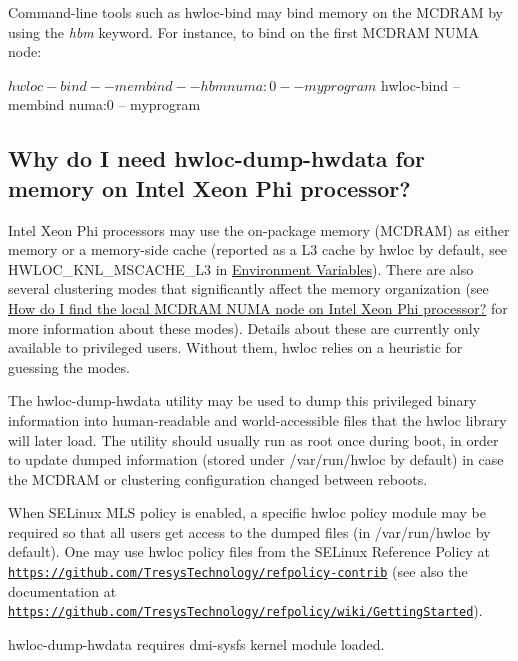 Command-\/line tools such as {\ttfamily hwloc-\/bind} may bind memory on the M\+C\+D\+R\+AM by using the {\itshape hbm} keyword. For instance, to bind on the first M\+C\+D\+R\+AM N\+U\+MA node\+:

\begin{DoxyVerb}$ hwloc-bind --membind --hbm numa:0 -- myprogram
$ hwloc-bind --membind numa:0 -- myprogram
\end{DoxyVerb}
\hypertarget{a00394_faq_knl_dump}{}\subsection{Why do I need hwloc-\/dump-\/hwdata for memory on Intel Xeon Phi processor?}\label{a00394_faq_knl_dump}
Intel Xeon Phi processors may use the on-\/package memory (M\+C\+D\+R\+AM) as either memory or a memory-\/side cache (reported as a L3 cache by hwloc by default, see {\ttfamily H\+W\+L\+O\+C\+\_\+\+K\+N\+L\+\_\+\+M\+S\+C\+A\+C\+H\+E\+\_\+\+L3} in \hyperlink{a00382}{Environment Variables}). There are also several clustering modes that significantly affect the memory organization (see \hyperlink{a00394_faq_knl_numa}{How do I find the local M\+C\+D\+R\+AM N\+U\+MA node on Intel Xeon Phi processor?} for more information about these modes). Details about these are currently only available to privileged users. Without them, hwloc relies on a heuristic for guessing the modes.

The hwloc-\/dump-\/hwdata utility may be used to dump this privileged binary information into human-\/readable and world-\/accessible files that the hwloc library will later load. The utility should usually run as root once during boot, in order to update dumped information (stored under /var/run/hwloc by default) in case the M\+C\+D\+R\+AM or clustering configuration changed between reboots.

When S\+E\+Linux M\+LS policy is enabled, a specific hwloc policy module may be required so that all users get access to the dumped files (in /var/run/hwloc by default). One may use hwloc policy files from the S\+E\+Linux Reference Policy at \href{https://github.com/TresysTechnology/refpolicy-contrib}{\tt https\+://github.\+com/\+Tresys\+Technology/refpolicy-\/contrib} (see also the documentation at \href{https://github.com/TresysTechnology/refpolicy/wiki/GettingStarted}{\tt https\+://github.\+com/\+Tresys\+Technology/refpolicy/wiki/\+Getting\+Started}).

hwloc-\/dump-\/hwdata requires {\ttfamily dmi-\/sysfs} kernel module loaded.

